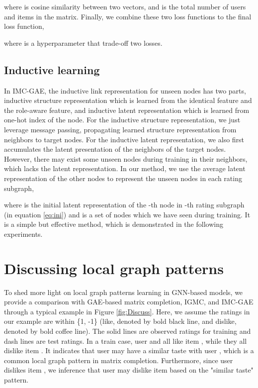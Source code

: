 \documentclass[sigconf]{acmart}
\begin{document}
where  is cosine similarity between two vectors, and
 is the total number of users and items in the matrix. Finally, we combine these two loss functions to the final loss function,

where  is a hyperparameter that trade-off two losses.

\subsection{Inductive learning}
In IMC-GAE, the inductive link representation for unseen nodes has two parts, inductive structure representation which is learned from the identical feature and the role-aware feature, and inductive latent representation which is learned from one-hot index of the node. 
For the inductive structure representation, we just leverage message passing, propagating learned structure representation from neighbors to target nodes. 
For the inductive latent representation, we also first accumulates the latent presentation of the neighbors of the target nodes. However, there may exist some unseen nodes during training in their neighbors, which lacks the latent representation. 
In our method, we use the average latent representation of the other nodes to represent the unseen nodes in each rating subgraph,
\vspace{-5pt}

where  is the initial latent representation of the -th node in -th rating subgraph (in equation \ref{eq:ini}) and  is a set of nodes which we have seen during training. It is a simple but effective method, which is demonstrated in the following experiments.

\section{Discussing local graph patterns}
To shed more light on local graph patterns learning in GNN-based models, we provide a comparison with GAE-based matrix completion, IGMC, and IMC-GAE through a typical example in Figure \ref{fig:Discuss}. Here, we assume the ratings in our example are within \{1, -1\} (like, denoted by  bold black line, and dislike, denoted by bold coffee line). The solid lines are observed ratings for training and dash lines are test ratings. In a train case, user  and  all like item , while they all dislike item . It indicates that user  may have a similar taste with user , which is a common local graph pattern in matrix completion. Furthermore, since user  dislikes item , we inference that user  may dislike item  based on the "similar taste" pattern.
\end{document}
